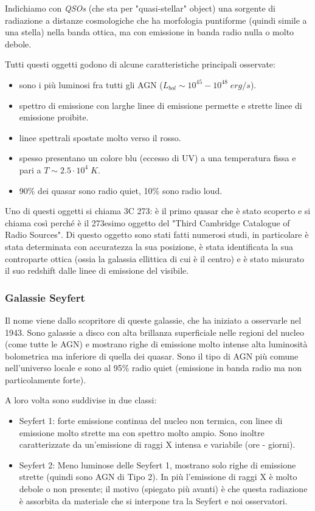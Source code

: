 Indichiamo con \emph{QSOs} (che sta per "quasi-stellar" object) una sorgente di radiazione a distanze cosmologiche che ha morfologia puntiforme (quindi simile a una stella) nella banda ottica, ma con emissione in banda radio nulla o molto debole.

Tutti questi oggetti godono di alcune caratteristiche principali osservate:
\begin{itemize}
    \item sono i più luminosi fra tutti gli AGN ($L_{bol} \sim 10^{45}-10^{48} \;\si{erg}/\si{s}$).
    \item spettro di emissione con larghe linee di emissione permette e strette linee di emissione proibite.
    \item linee spettrali spostate molto verso il rosso.
    \item spesso presentano un colore blu (eccesso di UV) a una temperatura fissa e pari a $T\sim 2.5\cdot 10^4 \;\si{K}$.
    \item 90\% dei quasar sono radio quiet, 10\% sono radio loud.
\end{itemize}

Uno di questi oggetti si chiama 3C 273: è il primo quasar che è stato scoperto e si chiama così perché è il 273esimo oggetto del "Third Cambridge Catalogue of Radio Sources". Di questo oggetto sono stati fatti numerosi studi, in particolare è stata determinata con accuratezza la sua posizione, è stata identificata la sua controparte ottica (ossia la galassia ellittica di cui è il centro) e è stato misurato il suo redshift dalle linee di emissione del visibile. 

\subsubsection{Galassie Seyfert}
Il nome viene dallo scopritore di queste galassie, che ha iniziato a osservarle nel 1943. Sono galassie a disco con alta brillanza superficiale nelle regioni del nucleo (come tutte le AGN) e mostrano righe di emissione molto intense alta luminosità bolometrica ma inferiore di quella dei quasar.
Sono il tipo di AGN più comune nell’universo locale e sono al 95\% radio quiet (emissione in banda radio ma non particolamente forte).

A loro volta sono suddivise in due classi: 
\begin{itemize}
    \item Seyfert 1: forte emissione continua del nucleo non termica, con linee di emissione molto strette ma con spettro molto ampio. Sono inoltre caratterizzate da un'emissione di raggi X intensa e variabile (ore - giorni).
    \item Seyfert 2: Meno luminose delle Seyfert 1, mostrano solo righe di emissione strette (quindi sono AGN di Tipo 2). In più l'emissione di raggi X è molto debole o non presente; il motivo (spiegato più avanti) è che questa radiazione è assorbita da materiale che si interpone tra la Seyfert e noi osservatori. 
\end{itemize}

